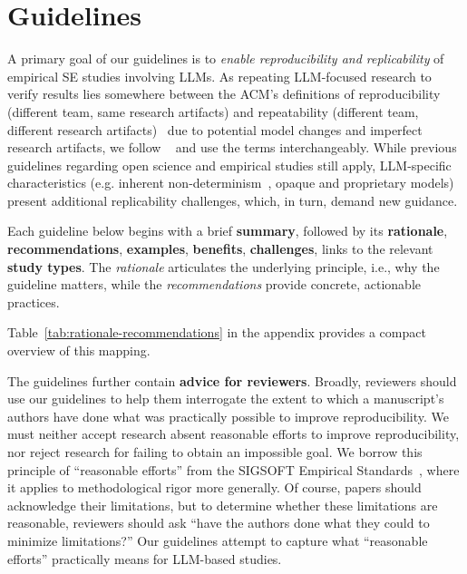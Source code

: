 \documentclass[smallextended]{svjour3}
\newif\ifpaper\papertrue
\begin{document}
\section{Guidelines}
\label{sec:guidelines}

A primary goal of our guidelines is to \emph{enable reproducibility and replicability} of empirical SE studies involving LLMs. As repeating LLM-focused research to verify results lies somewhere between the ACM's definitions of reproducibility (different team, same research artifacts) and repeatability (different team, different research artifacts)~\cite{acm2020artifactreview} due to potential model changes and imperfect research artifacts, we follow \citeauthor{DBLP:journals/corr/abs-2510-25506}~\cite{DBLP:journals/corr/abs-2510-25506} and use the terms interchangeably. While previous guidelines regarding open science and empirical studies still apply, LLM-specific characteristics (e.g. inherent non-determinism~\cite{DBLP:conf/naacl/SongWLL25, YuanNondeterminismLLMInference}, opaque and proprietary models) present additional replicability challenges, which, in turn, demand new guidance.

Each guideline below begins with a brief \textbf{summary}, followed by its \textbf{rationale}, \textbf{recommendations}, \textbf{examples}, \textbf{benefits}, \textbf{challenges}, links to the relevant \textbf{study types}.
The \emph{rationale} articulates the underlying principle, i.e., why the guideline matters, while the \emph{recommendations} provide concrete, actionable practices.
\ifpaper
Table~\ref{tab:rationale-recommendations} in the appendix provides a compact overview of this mapping.
\fi

The guidelines further contain \textbf{advice for reviewers}.
Broadly, reviewers should use our guidelines to help them interrogate the extent to which a manuscript's authors have done what was practically possible to improve reproducibility. We must neither accept research absent reasonable efforts to improve reproducibility, nor reject research for failing to obtain an impossible goal. We borrow this principle of ``reasonable efforts'' from the SIGSOFT Empirical Standards~\cite{ralph2021empiricalstandardssoftwareengineering}, where it applies to methodological rigor more generally. Of course, papers should acknowledge their limitations, but to determine whether these limitations are reasonable, reviewers should ask ``have the authors done what they could to minimize limitations?'' Our guidelines attempt to capture what ``reasonable efforts'' practically means for LLM-based studies.
\end{document}

